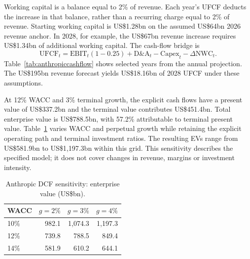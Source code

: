 \documentclass[11pt]{article}
\begin{document}
Working capital is a balance equal to 2\% of revenue. Each year's UFCF deducts the increase in that balance, rather than a recurring charge equal to 2\% of revenue. Starting working capital is US\$1.28bn on the assumed US\$64bn 2026 revenue anchor. In 2028, for example, the US\$67bn revenue increase requires US\$1.34bn of additional working capital. The cash-flow bridge is
\[
\mathrm{UFCF}_t=\mathrm{EBIT}_t(1-0.25)+\mathrm{D\&A}_t-\mathrm{Capex}_t-\Delta\mathrm{NWC}_t.
\]
Table~\ref{tab:anthropiccashflow} shows selected years from the annual projection. The US\$195bn revenue forecast yields US\$18.16bn of 2028 UFCF under these assumptions.

\begin{table}[H]
\centering
\small
\caption{Selected Anthropic cash-flow projections (US\$bn, except margin).}
\label{tab:anthropiccashflow}
\end{table}

At 12\% WACC and 3\% terminal growth, the explicit cash flows have a present value of US\$337.2bn and the terminal value contributes US\$451.4bn. Total enterprise value is US\$788.5bn, with 57.2\% attributable to terminal present value. Table~\ref{tab:anthropicsensitivity} varies WACC and perpetual growth while retaining the explicit operating path and terminal investment ratios. The resulting EVs range from US\$581.9bn to US\$1{,}197.3bn within this grid. This sensitivity describes the specified model; it does not cover changes in revenue, margins or investment intensity.

\begin{table}[H]
\centering
\caption{Anthropic DCF sensitivity: enterprise value (US\$bn).}
\label{tab:anthropicsensitivity}
\begin{tabular}{lrrr}
\toprule
WACC & $g=2\%$ & $g=3\%$ & $g=4\%$ \\
\midrule
10\% & 982.1 & 1{,}074.3 & 1{,}197.3 \\
12\% & 739.8 & 788.5 & 849.4 \\
14\% & 581.9 & 610.2 & 644.1 \\
\bottomrule
\end{tabular}
\end{table}
\end{document}
